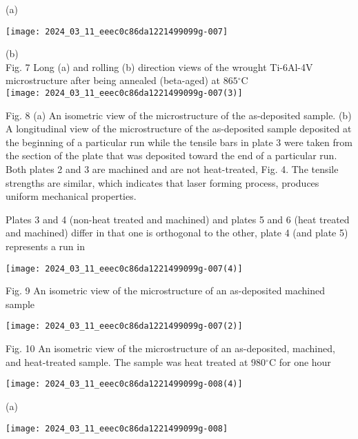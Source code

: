 \documentclass[10pt]{article}
\begin{document}
(a)

\begin{center}
\texttt{[image: 2024\_03\_11\_eeec0c86da1221499099g-007]}
\end{center}

(b)\\
Fig. 7 Long (a) and rolling (b) direction views of the wrought Ti-6Al-4V microstructure after being annealed (beta-aged) at $865{ }^{\circ} \mathrm{C}$\\
\texttt{[image: 2024\_03\_11\_eeec0c86da1221499099g-007(3)]}

Fig. 8 (a) An isometric view of the microstructure of the as-deposited sample. (b) A longitudinal view of the microstructure of the as-deposited sample deposited at the beginning of a particular run while the tensile bars in plate 3 were taken from the section of the plate that was deposited toward the end of a particular run. Both plates 2 and 3 are machined and are not heat-treated, Fig. 4. The tensile strengths are similar, which indicates that laser forming process, produces uniform mechanical properties.

Plates 3 and 4 (non-heat treated and machined) and plates 5 and 6 (heat treated and machined) differ in that one is orthogonal to the other, plate 4 (and plate 5) represents a run in

\begin{center}
\texttt{[image: 2024\_03\_11\_eeec0c86da1221499099g-007(4)]}
\end{center}

Fig. 9 An isometric view of the microstructure of an as-deposited machined sample

\begin{center}
\texttt{[image: 2024\_03\_11\_eeec0c86da1221499099g-007(2)]}
\end{center}

Fig. 10 An isometric view of the microstructure of an as-deposited, machined, and heat-treated sample. The sample was heat treated at $980{ }^{\circ} \mathrm{C}$ for one hour

\begin{center}
\texttt{[image: 2024\_03\_11\_eeec0c86da1221499099g-008(4)]}
\end{center}

(a)

\begin{center}
\texttt{[image: 2024\_03\_11\_eeec0c86da1221499099g-008]}
\end{center}
\end{document}
